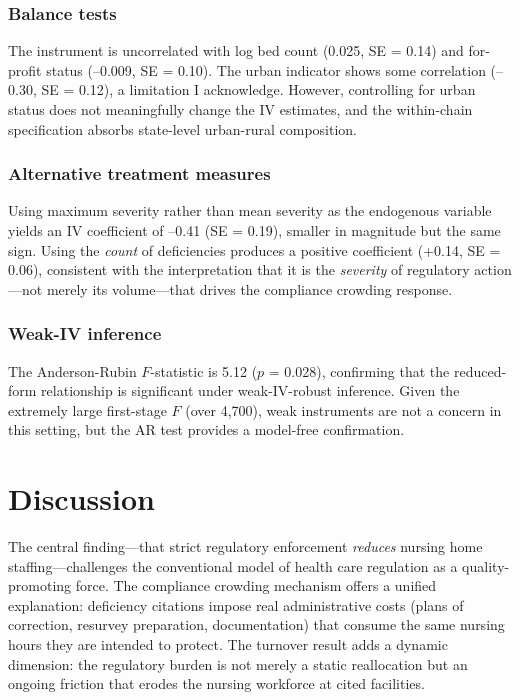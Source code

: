 \documentclass[12pt]{article}
\begin{document}
\subsubsection*{Balance tests} The instrument is uncorrelated with log bed count (0.025, SE = 0.14) and for-profit status (--0.009, SE = 0.10). The urban indicator shows some correlation (--0.30, SE = 0.12), a limitation I acknowledge. However, controlling for urban status does not meaningfully change the IV estimates, and the within-chain specification absorbs state-level urban-rural composition.

\subsubsection*{Alternative treatment measures} Using maximum severity rather than mean severity as the endogenous variable yields an IV coefficient of --0.41 (SE = 0.19), smaller in magnitude but the same sign. Using the \textit{count} of deficiencies produces a positive coefficient (+0.14, SE = 0.06), consistent with the interpretation that it is the \textit{severity} of regulatory action---not merely its volume---that drives the compliance crowding response.

\subsubsection*{Weak-IV inference} The Anderson-Rubin $F$-statistic is 5.12 ($p$ = 0.028), confirming that the reduced-form relationship is significant under weak-IV-robust inference. Given the extremely large first-stage $F$ (over 4,700), weak instruments are not a concern in this setting, but the AR test provides a model-free confirmation.

\section{Discussion}

The central finding---that strict regulatory enforcement \textit{reduces} nursing home staffing---challenges the conventional model of health care regulation as a quality-promoting force. The compliance crowding mechanism offers a unified explanation: deficiency citations impose real administrative costs (plans of correction, resurvey preparation, documentation) that consume the same nursing hours they are intended to protect. The turnover result adds a dynamic dimension: the regulatory burden is not merely a static reallocation but an ongoing friction that erodes the nursing workforce at cited facilities.
\end{document}
